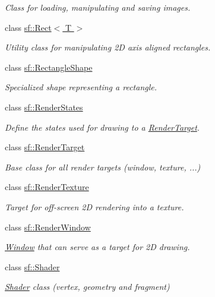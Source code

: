 \begin{DoxyCompactItemize}
\begin{DoxyCompactList}\small\item\em Class for loading, manipulating and saving images. \end{DoxyCompactList}\item 
class \hyperlink{classsf_1_1_rect}{sf\+::\+Rect$<$ T $>$}
\begin{DoxyCompactList}\small\item\em Utility class for manipulating 2D axis aligned rectangles. \end{DoxyCompactList}\item 
class \hyperlink{classsf_1_1_rectangle_shape}{sf\+::\+Rectangle\+Shape}
\begin{DoxyCompactList}\small\item\em Specialized shape representing a rectangle. \end{DoxyCompactList}\item 
class \hyperlink{classsf_1_1_render_states}{sf\+::\+Render\+States}
\begin{DoxyCompactList}\small\item\em Define the states used for drawing to a \hyperlink{classsf_1_1_render_target}{Render\+Target}. \end{DoxyCompactList}\item 
class \hyperlink{classsf_1_1_render_target}{sf\+::\+Render\+Target}
\begin{DoxyCompactList}\small\item\em Base class for all render targets (window, texture, ...) \end{DoxyCompactList}\item 
class \hyperlink{classsf_1_1_render_texture}{sf\+::\+Render\+Texture}
\begin{DoxyCompactList}\small\item\em Target for off-\/screen 2D rendering into a texture. \end{DoxyCompactList}\item 
class \hyperlink{classsf_1_1_render_window}{sf\+::\+Render\+Window}
\begin{DoxyCompactList}\small\item\em \hyperlink{classsf_1_1_window}{Window} that can serve as a target for 2D drawing. \end{DoxyCompactList}\item 
class \hyperlink{classsf_1_1_shader}{sf\+::\+Shader}
\begin{DoxyCompactList}\small\item\em \hyperlink{classsf_1_1_shader}{Shader} class (vertex, geometry and fragment) \end{DoxyCompactList}\item 

\end{DoxyCompactItemize}
